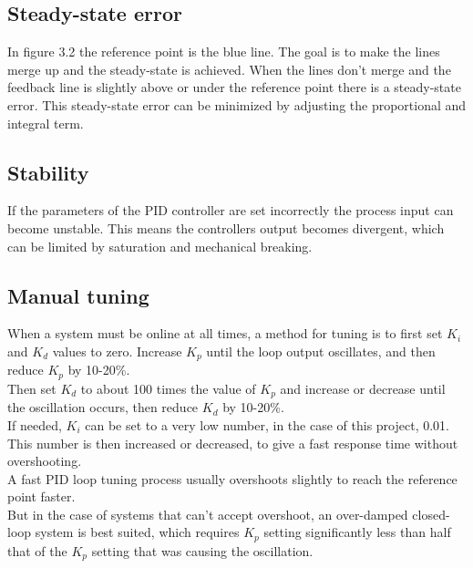 \subsection {Steady-state error}
In figure 3.2 the reference point is the blue line. The goal is to make the lines merge up and the steady-state is achieved. When the lines don't merge and the feedback line is slightly above or under the reference point there is a steady-state error. This steady-state error can be minimized by adjusting the proportional and integral term. 


\subsection {Stability} 

If the parameters of the PID controller are set incorrectly the process input can become unstable.
This means the controllers output becomes divergent, which can be limited by saturation and mechanical breaking. \\

\subsection {Manual tuning} 
When a system must be online at all times, a method for tuning is to first set $K_i$ and $K_d$ values to zero. Increase $K_p$ until the loop output oscillates, and then reduce $K_p$ by 10-20\%.\\
Then set $K_d$ to about 100 times the value of $K_p$ and increase or decrease until the oscillation occurs, then reduce $K_d$ by 10-20\%.\\
If needed, $K_i$ can be set to a very low number, in the case of this project, 0.01. This number is then increased or decreased, to give a fast response time without overshooting.
\\ 
A fast PID loop tuning process usually overshoots slightly to reach the reference point faster.\\ 
But in the case of systems that can't accept overshoot, an over-damped closed-loop system is best suited, which requires $K_p$ setting significantly less than half that of the $K_p$ setting that was causing the oscillation.
\\

